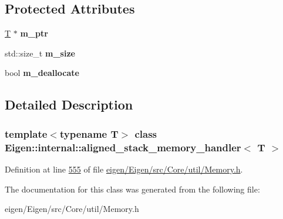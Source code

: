 \subsection*{Protected Attributes}
\begin{DoxyCompactItemize}
\item 
\mbox{\label{class_eigen_1_1internal_1_1aligned__stack__memory__handler_a329111d8704448bf73ab0a7101f864e8}} 
\hyperlink{group___sparse_core___module}{T} $\ast$ {\bfseries m\+\_\+ptr}
\item 
\mbox{\label{class_eigen_1_1internal_1_1aligned__stack__memory__handler_aacdeb3bdb417af342c7c871ca6cc37f8}} 
std\+::size\+\_\+t {\bfseries m\+\_\+size}
\item 
\mbox{\label{class_eigen_1_1internal_1_1aligned__stack__memory__handler_ad09991a594bdf6a44f1f05132d49cb2f}} 
bool {\bfseries m\+\_\+deallocate}
\end{DoxyCompactItemize}


\subsection{Detailed Description}
\subsubsection*{template$<$typename T$>$\newline
class Eigen\+::internal\+::aligned\+\_\+stack\+\_\+memory\+\_\+handler$<$ T $>$}



Definition at line \hyperlink{eigen_2_eigen_2src_2_core_2util_2_memory_8h_source_l00555}{555} of file \hyperlink{eigen_2_eigen_2src_2_core_2util_2_memory_8h_source}{eigen/\+Eigen/src/\+Core/util/\+Memory.\+h}.



The documentation for this class was generated from the following file\+:\begin{DoxyCompactItemize}
\item 
eigen/\+Eigen/src/\+Core/util/\+Memory.\+h\end{DoxyCompactItemize}
